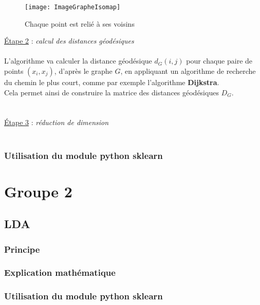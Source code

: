 \documentclass[12pt]{report}
\begin{document}
\begin{figure}[H] 
\centerline{\texttt{[image: ImageGrapheIsomap]}}
\caption{Chaque point est relié à ses voisins}
\end{figure}


\noindent \underline{\'Etape 2} : \textit{calcul des distances géodésiques}\\ \\
L'algorithme va calculer la distance géodésique $d_{G}(i,j)$ pour chaque paire de points $(x_{i},x_{j})$, d'après le graphe $G$, en appliquant un algorithme de recherche du chemin le plus court, comme par exemple l'algorithme \textbf{Dijkstra}.\\
Cela permet ainsi de construire la matrice des distances géodésiques $D_{G}$.\\ \\ \\


\noindent \underline{\'Etape 3} : \textit{réduction de dimension}\\ \\


\subsubsection{Utilisation du module python sklearn}



\section{Groupe 2}

\subsection{LDA}

\subsubsection{Principe}

\subsubsection{Explication mathématique}

\subsubsection{Utilisation du module python sklearn}
\end{document}

